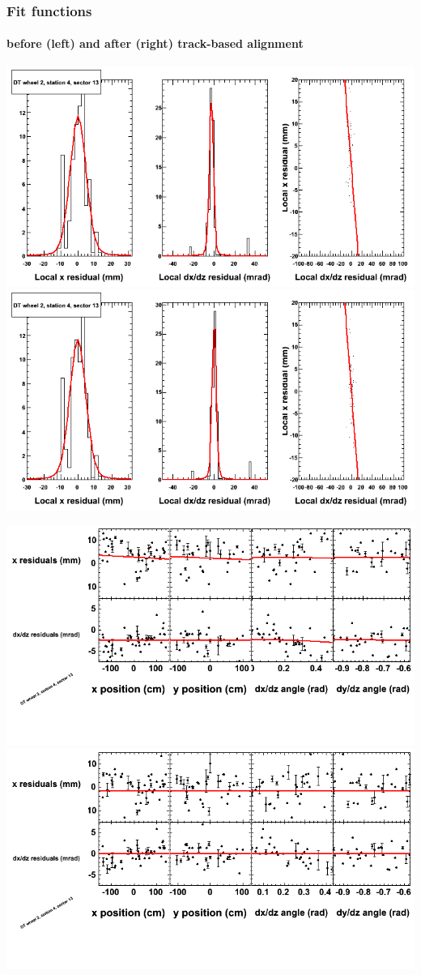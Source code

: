 \documentclass[compress]{beamer}
\begin{document}
\begin{frame}
\frametitle{Fit functions}
\framesubtitle{before (left) and after (right) track-based alignment}
\includegraphics[width=0.5\linewidth]{fitfunctions_re01/MBwhEst4sec13_bellcurves.png} \includegraphics[width=0.5\linewidth]{fitfunctions_re05/MBwhEst4sec13_bellcurves.png}

\includegraphics[width=0.5\linewidth]{fitfunctions_re01/MBwhEst4sec13_polynomials.png} \includegraphics[width=0.5\linewidth]{fitfunctions_re05/MBwhEst4sec13_polynomials.png}
\end{frame}
\end{document}
